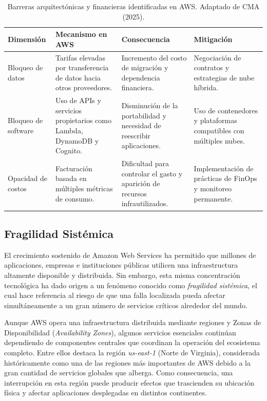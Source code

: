 \documentclass[12pt,a4paper]{article}
\begin{document}
\begin{table}[H]
\centering
\caption{Barreras arquitectónicas y financieras identificadas en AWS. Adaptado de CMA (2025).}
\label{tab:barreras_aws}

\begin{tabular}{p{3.2cm}p{3.8cm}p{4.6cm}p{3.8cm}}
\toprule
\textbf{Dimensión} &
\textbf{Mecanismo en AWS} &
\textbf{Consecuencia} &
\textbf{Mitigación} \\
\midrule

Bloqueo de datos &
Tarifas elevadas por transferencia de datos hacia otros proveedores. &
Incremento del costo de migración y dependencia financiera. &
Negociación de contratos y estrategias de nube híbrida. \\

Bloqueo de software &
Uso de APIs y servicios propietarios como Lambda, DynamoDB y Cognito. &
Disminución de la portabilidad y necesidad de reescribir aplicaciones. &
Uso de contenedores y plataformas compatibles con múltiples nubes. \\

Opacidad de costos &
Facturación basada en múltiples métricas de consumo. &
Dificultad para controlar el gasto y aparición de recursos infrautilizados. &
Implementación de prácticas de FinOps y monitoreo permanente. \\

\bottomrule
\end{tabular}

\end{table}


\subsection{Fragilidad Sistémica}
El crecimiento sostenido de Amazon Web Services ha permitido que millones de aplicaciones, empresas e instituciones públicas utilicen una infraestructura altamente disponible y distribuida. Sin embargo, esta misma concentración tecnológica ha dado origen a un fenómeno conocido como \textit{fragilidad sistémica}, el cual hace referencia al riesgo de que una falla localizada pueda afectar simultáneamente a un gran número de servicios críticos alrededor del mundo.\parencite{aws_network_2021}

Aunque AWS opera una infraestructura distribuida mediante regiones y Zonas de Disponibilidad (\textit{Availability Zones}), algunos servicios esenciales continúan dependiendo de componentes centrales que coordinan la operación del ecosistema completo. Entre ellos destaca la región \textit{us-east-1} (Norte de Virginia), considerada históricamente como una de las regiones más importantes de AWS debido a la gran cantidad de servicios globales que alberga. Como consecuencia, una interrupción en esta región puede producir efectos que trascienden su ubicación física y afectar aplicaciones desplegadas en distintos continentes.\parencite{aws_network_2021}
\end{document}
